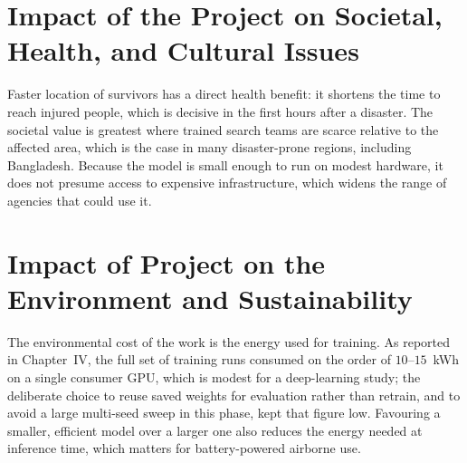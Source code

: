 \section{Impact of the Project on Societal, Health, and Cultural Issues}
Faster location of survivors has a direct health benefit: it shortens the time to
reach injured people, which is decisive in the first hours after a disaster. The
societal value is greatest where trained search teams are scarce relative to the
affected area, which is the case in many disaster-prone regions, including
Bangladesh. Because the model is small enough to run on modest hardware, it does
not presume access to expensive infrastructure, which widens the range of agencies
that could use it.

\section{Impact of Project on the Environment and Sustainability}
The environmental cost of the work is the energy used for training. As reported in
Chapter~IV, the full set of training runs consumed on the order of $10$--$15$~kWh on
a single consumer GPU, which is modest for a deep-learning study; the deliberate
choice to reuse saved weights for evaluation rather than retrain, and to avoid a
large multi-seed sweep in this phase, kept that figure low. Favouring a smaller,
efficient model over a larger one also reduces the energy needed at inference time,
which matters for battery-powered airborne use.
